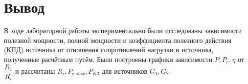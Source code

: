 \section*{Вывод}

В ходе лабораторной работы экспериментально были исследованы зависимости полезной
мощности, полной мощности и коэффициента полезного действия (КПД)
источника от отношения сопротивлений нагрузки и источника, полученные расчётным путём. Были построены графики зависимости $ P, P_e, \eta $ от $ \dfrac{R_1}{R_i} $ и рассчитаны $ R_i, P_{e\ max}, P_{K3} $ для источников $ G_1, G_2 $.